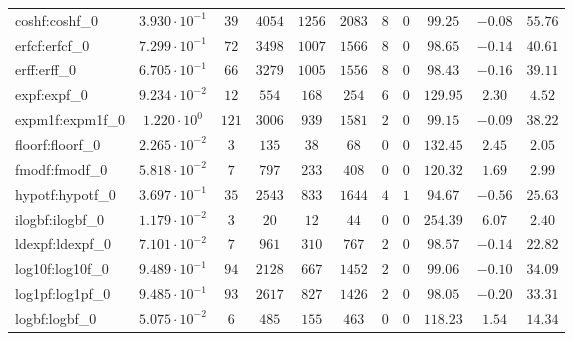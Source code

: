 \begin{tabular}{|l|c|c|c|c|c|c|c|c|c|c|}
coshf:coshf\_0               & $ 3.930 \cdot 10^{-1} $ & $ 39     $ & $ 4054  $ & $ 1256  $ & $ 2083  $ & $ 8   $ & $ 0 $ & $ 99.25       $ & $ -0.08   $ & $ 55.76   $ \\
erfcf:erfcf\_0               & $ 7.299 \cdot 10^{-1} $ & $ 72     $ & $ 3498  $ & $ 1007  $ & $ 1566  $ & $ 8   $ & $ 0 $ & $ 98.65       $ & $ -0.14   $ & $ 40.61   $ \\
erff:erff\_0                 & $ 6.705 \cdot 10^{-1} $ & $ 66     $ & $ 3279  $ & $ 1005  $ & $ 1556  $ & $ 8   $ & $ 0 $ & $ 98.43       $ & $ -0.16   $ & $ 39.11   $ \\
expf:expf\_0                 & $ 9.234 \cdot 10^{-2} $ & $ 12     $ & $ 554   $ & $ 168   $ & $ 254   $ & $ 6   $ & $ 0 $ & $ 129.95      $ & $ 2.30    $ & $ 4.52    $ \\
expm1f:expm1f\_0             & $ 1.220 \cdot 10^{0}  $ & $ 121    $ & $ 3006  $ & $ 939   $ & $ 1581  $ & $ 2   $ & $ 0 $ & $ 99.15       $ & $ -0.09   $ & $ 38.22   $ \\
floorf:floorf\_0             & $ 2.265 \cdot 10^{-2} $ & $ 3      $ & $ 135   $ & $ 38    $ & $ 68    $ & $ 0   $ & $ 0 $ & $ 132.45      $ & $ 2.45    $ & $ 2.05    $ \\
fmodf:fmodf\_0               & $ 5.818 \cdot 10^{-2} $ & $ 7      $ & $ 797   $ & $ 233   $ & $ 408   $ & $ 0   $ & $ 0 $ & $ 120.32      $ & $ 1.69    $ & $ 2.99    $ \\
hypotf:hypotf\_0             & $ 3.697 \cdot 10^{-1} $ & $ 35     $ & $ 2543  $ & $ 833   $ & $ 1644  $ & $ 4   $ & $ 1 $ & $ 94.67       $ & $ -0.56   $ & $ 25.63   $ \\
ilogbf:ilogbf\_0             & $ 1.179 \cdot 10^{-2} $ & $ 3      $ & $ 20    $ & $ 12    $ & $ 44    $ & $ 0   $ & $ 0 $ & $ 254.39      $ & $ 6.07    $ & $ 2.40    $ \\
ldexpf:ldexpf\_0             & $ 7.101 \cdot 10^{-2} $ & $ 7      $ & $ 961   $ & $ 310   $ & $ 767   $ & $ 2   $ & $ 0 $ & $ 98.57       $ & $ -0.14   $ & $ 22.82   $ \\
log10f:log10f\_0             & $ 9.489 \cdot 10^{-1} $ & $ 94     $ & $ 2128  $ & $ 667   $ & $ 1452  $ & $ 2   $ & $ 0 $ & $ 99.06       $ & $ -0.10   $ & $ 34.09   $ \\
log1pf:log1pf\_0             & $ 9.485 \cdot 10^{-1} $ & $ 93     $ & $ 2617  $ & $ 827   $ & $ 1426  $ & $ 2   $ & $ 0 $ & $ 98.05       $ & $ -0.20   $ & $ 33.31   $ \\
logbf:logbf\_0               & $ 5.075 \cdot 10^{-2} $ & $ 6      $ & $ 485   $ & $ 155   $ & $ 463   $ & $ 0   $ & $ 0 $ & $ 118.23      $ & $ 1.54    $ & $ 14.34   $ \\

\end{tabular}
